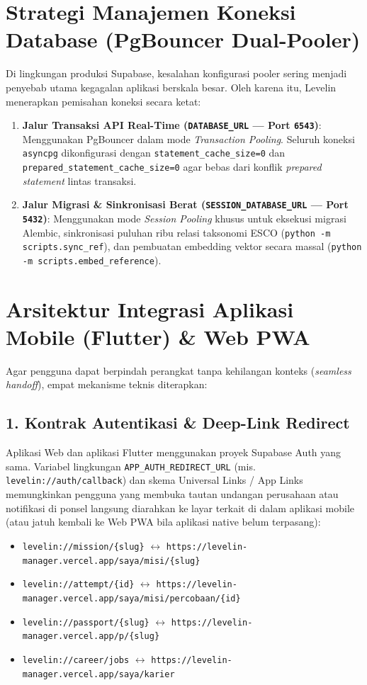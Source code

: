 \documentclass[11pt,a4paper]{report}
\begin{document}
\section{Strategi Manajemen Koneksi Database (PgBouncer Dual-Pooler)}
Di lingkungan produksi Supabase, kesalahan konfigurasi pooler sering menjadi penyebab utama kegagalan aplikasi berskala besar. Oleh karena itu, Levelin menerapkan pemisahan koneksi secara ketat:
\begin{enumerate}[leftmargin=1.5em]
    \item \textbf{Jalur Transaksi API Real-Time (\texttt{DATABASE\_URL} --- Port \texttt{6543})}:
    Menggunakan PgBouncer dalam mode \textit{Transaction Pooling}. Seluruh koneksi \texttt{asyncpg} dikonfigurasi dengan \texttt{statement\_cache\_size=0} dan \texttt{prepared\_statement\_cache\_size=0} agar bebas dari konflik \textit{prepared statement} lintas transaksi.
    \item \textbf{Jalur Migrasi \& Sinkronisasi Berat (\texttt{SESSION\_DATABASE\_URL} --- Port \texttt{5432})}:
    Menggunakan mode \textit{Session Pooling} khusus untuk eksekusi migrasi Alembic, sinkronisasi puluhan ribu relasi taksonomi ESCO (\texttt{python -m scripts.sync\_ref}), dan pembuatan embedding vektor secara massal (\texttt{python -m scripts.embed\_reference}).
\end{enumerate}

\section{Arsitektur Integrasi Aplikasi Mobile (Flutter) \& Web PWA}
Agar pengguna dapat berpindah perangkat tanpa kehilangan konteks (\textit{seamless handoff}), empat mekanisme teknis diterapkan:

\subsection{1. Kontrak Autentikasi \& Deep-Link Redirect}
Aplikasi Web dan aplikasi Flutter menggunakan proyek Supabase Auth yang sama. Variabel lingkungan \texttt{APP\_AUTH\_REDIRECT\_URL} (mis. \texttt{levelin://auth/callback}) dan skema Universal Links / App Links memungkinkan pengguna yang membuka tautan undangan perusahaan atau notifikasi di ponsel langsung diarahkan ke layar terkait di dalam aplikasi mobile (atau jatuh kembali ke Web PWA bila aplikasi native belum terpasang):
\begin{itemize}[leftmargin=1.5em]
    \item \texttt{levelin://mission/\{slug\}} $\leftrightarrow$ \texttt{https://levelin-manager.vercel.app/saya/misi/\{slug\}}
    \item \texttt{levelin://attempt/\{id\}} $\leftrightarrow$ \texttt{https://levelin-manager.vercel.app/saya/misi/percobaan/\{id\}}
    \item \texttt{levelin://passport/\{slug\}} $\leftrightarrow$ \texttt{https://levelin-manager.vercel.app/p/\{slug\}}
    \item \texttt{levelin://career/jobs} $\leftrightarrow$ \texttt{https://levelin-manager.vercel.app/saya/karier}
\end{itemize}
\end{document}
